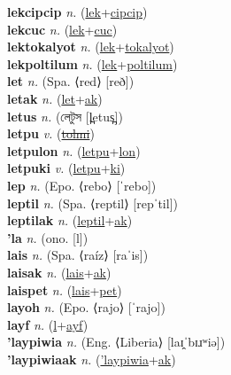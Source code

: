\textbf{lekcipcip} \textit{n.} (\hyperref[lek]{lek}+\hyperref[cipcip]{cipcip})
 \label{lekcipcip} \\
\textbf{lekcuc} \textit{n.} (\hyperref[lek]{lek}+\hyperref[cuc]{cuc})
 \label{lekcuc} \\
\textbf{lektokalyot} \textit{n.} (\hyperref[lek]{lek}+\hyperref[tokalyot]{tokalyot})
 \label{lektokalyot} \\
\textbf{lekpoltilum} \textit{n.} (\hyperref[lek]{lek}+\hyperref[poltilum]{poltilum})
 \label{lekpoltilum} \\
\textbf{let} \textit{n.} (Spa. ⟨red⟩ [reð])
 \label{let} \\
\textbf{letak} \textit{n.} (\hyperref[let]{let}+\hyperref[ak]{ak})
 \label{letak} \\
\textbf{letus} \textit{n.} ({\bengali{}লেটুস} [l̪etus̪])
 \label{letus} \\
\textbf{letpu} \textit{v.} (\hyperref[tolmi]{\sout{tolmi}})
 \label{letpu} \\
\textbf{letpulon} \textit{n.} (\hyperref[letpu]{letpu}+\hyperref[lon]{lon})
 \label{letpulon} \\
\textbf{letpuki} \textit{v.} (\hyperref[letpu]{letpu}+\hyperref[ki]{ki})
 \label{letpuki} \\
\textbf{lep} \textit{n.} (Epo. ⟨rebo⟩ [ˈrebo])
 \label{lep} \\
\textbf{leptil} \textit{n.} (Spa. ⟨reptil⟩ [repˈtil])
 \label{leptil} \\
\textbf{leptilak} \textit{n.} (\hyperref[leptil]{leptil}+\hyperref[ak]{ak})
 \label{leptilak} \\
\textbf{'la} \textit{n.} (ono. [l])
 \label{'la} \\
\textbf{lais} \textit{n.} (Spa. ⟨raíz⟩ [raˈis])
 \label{lais} \\
\textbf{laisak} \textit{n.} (\hyperref[lais]{lais}+\hyperref[ak]{ak})
 \label{laisak} \\
\textbf{laispet} \textit{n.} (\hyperref[lais]{lais}+\hyperref[pet]{pet})
 \label{laispet} \\
\textbf{layoh} \textit{n.} (Epo. ⟨rajo⟩ [ˈrajo])
 \label{layoh} \\
\textbf{layf} \textit{n.} (\hyperref[l]{l}+\hyperref[ayf]{ayf})
 \label{layf} \\
\textbf{'laypiwia} \textit{n.} (Eng. ⟨Liberia⟩ [laɪ̯ˈbɪɹʷiə])
 \label{'laypiwia} \\
\textbf{'laypiwiaak} \textit{n.} (\hyperref['laypiwia]{'laypiwia}+\hyperref[ak]{ak})
 \label{'laypiwiaak} \\
